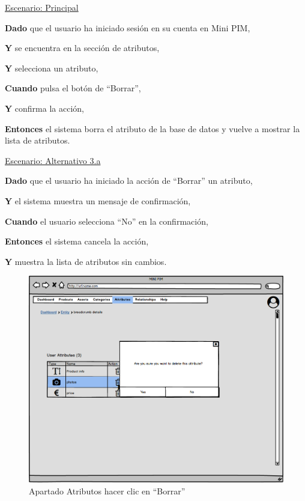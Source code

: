 \underline{Escenario: Principal}\par
\vspace{0.15cm}
\textbf{Dado} que el usuario ha iniciado sesión en su cuenta en Mini PIM,\par
\textbf{Y} se encuentra en la sección de atributos,\par
\textbf{Y} selecciona un atributo,\par
\textbf{Cuando} pulsa el botón de \enquote{Borrar},\par
\textbf{Y} confirma la acción,\par
\textbf{Entonces} el sistema borra el atributo de la base de datos y vuelve a mostrar la lista de atributos.\par
\vspace{0.20cm}

\underline{Escenario: Alternativo 3.a}\par
\vspace{0.15cm}
\textbf{Dado} que el usuario ha iniciado la acción de \enquote{Borrar} un atributo,\par
\textbf{Y} el sistema muestra un mensaje de confirmación,\par
\textbf{Cuando} el usuario selecciona \enquote{No} en la confirmación,\par
\textbf{Entonces} el sistema cancela la acción,\par
\textbf{Y} muestra la lista de atributos sin cambios.\par

\vspace{0.20cm}

\begin{figure}[H]
    \includegraphics[width=1\linewidth]{mockups/RF6.4BorrarAtributo.png}
    \caption{Apartado Atributos hacer clic en \enquote{Borrar}}
   \end{figure}
\vspace{1.0cm}


